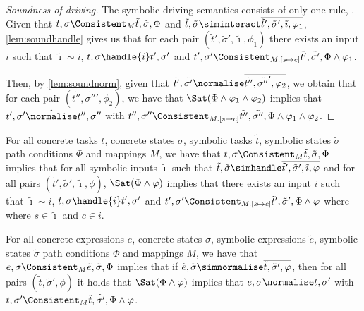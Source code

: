 \begin{proof}[Soundness of driving]
  The symbolic driving semantics consists of only one rule, .
  Given that $t,\sigma\Consistent_M\tilde{t},\tilde{\sigma},\Phi$ and $\tilde{t},\tilde{\sigma}\siminteract\overline{\tilde{t}',\tilde{\sigma}',\tilde{\imath},\phi_1}$,
  \cref{lem:soundhandle} gives us that for each pair $(\tilde{t}',\tilde{\sigma}',\tilde{\imath},\phi_1)$
  there exists an input $i$ such that $\tilde{\imath}\sim i$, $t,\sigma\handle{i}t',\sigma'$
  and $t',\sigma'\Consistent_{M.[s\mapsto c]}\tilde{t'},\tilde{\sigma'},\Phi\land\phi_1$.

  Then, by \cref{lem:soundnorm}, given that $\tilde{t'},\tilde{\sigma'}\normalise\overline{\tilde{t''},\tilde{\sigma''}',\phi_2}$,
  we obtain that for each pair $(\tilde{t''},\tilde{\sigma''}',\phi_2)$, we have that $\Sat(\Phi\land\phi_1\land\phi_2)$ implies
  that $t',\sigma'\hat{\normalise}t'',\sigma''$ with $t'',\sigma''\Consistent_{M.[s\mapsto c]}\tilde{t''},\tilde{\sigma''},\Phi\land\phi_1\land\phi_2$.
\end{proof}


\begin{lemma}
  \label{lem:soundhandle}

  For all concrete tasks $t$, concrete states $\sigma$, symbolic tasks $\tilde{t}$, symbolic states $\tilde{\sigma}$ path conditions $\Phi$ and mappings $M$,
  we have that $t,\sigma\Consistent_{M}\tilde{t},\tilde{\sigma},\Phi$ implies
  that for all symbolic inputs $\tilde{\imath}$ such that $\tilde{t},\tilde{\sigma}\simhandle\overline{\tilde{t}',\tilde{\sigma}',\tilde{\imath},\phi}$ and
  for all pairs $(\tilde{t}',\tilde{\sigma}',\tilde{\imath},\phi)$,
  $\Sat(\Phi\land\phi)$ implies that there exists an input $i$ such that $\tilde{\imath}\sim i$,  $t,\sigma\handle{i}t',\sigma'$ and $t',\sigma'\Consistent_{M.[s\mapsto c]}\tilde{t}',\tilde{\sigma}',\Phi\land\phi$ where where $s\in\tilde{\imath}$ and $c\in i$.

\end{lemma}



\begin{lemma}
  \label{lem:soundnorm}
  For all concrete expressions $e$, concrete states $\sigma$, symbolic expressions $\tilde{e}$, symbolic states $\tilde{\sigma}$ path conditions $\Phi$ and mappings $M$,
  we have that $e,\sigma\Consistent_{M}\tilde{e},\tilde{\sigma},\Phi$ implies
  that if $\tilde{e},\tilde{\sigma}\simnormalise\overline{\tilde{t},\tilde{\sigma}',\phi}$,
  then for all pairs $(\tilde{t},\tilde{\sigma}',\phi)$ it holds that $\Sat(\Phi\land\phi)$ implies
  that $e,\sigma\normalise t,\sigma'$ with $t,\sigma'\Consistent_{M}\tilde{t},\tilde{\sigma'},\Phi\land\phi$.
\end{lemma}

